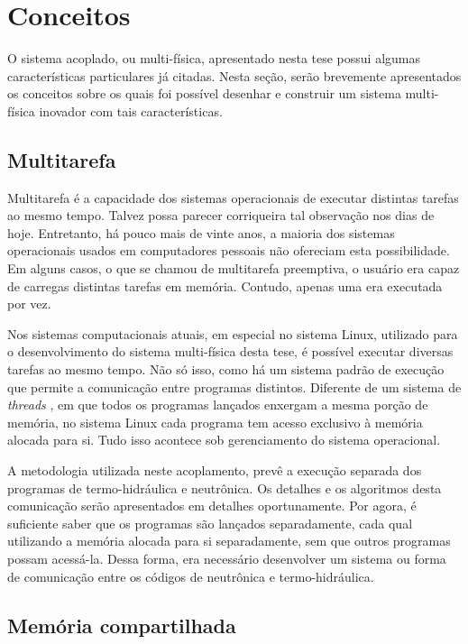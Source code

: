 \section{Conceitos}
\label{sec:conc}

O sistema acoplado, ou multi-física, apresentado nesta tese possui algumas características
particulares já citadas. Nesta seção, serão brevemente apresentados os conceitos sobre os quais
foi possível desenhar e construir um sistema multi-física inovador com tais características.

\subsection{Multitarefa}
\label{subsec:mt}

Multitarefa é a capacidade dos sistemas operacionais de executar distintas tarefas ao mesmo tempo.
Talvez possa parecer corriqueira tal observação nos dias de hoje. Entretanto, há pouco mais de vinte
anos, a maioria dos sistemas operacionais usados em computadores pessoais não ofereciam esta
possibilidade. Em alguns casos, o que se chamou de multitarefa preemptiva, o usuário era capaz de
carregas distintas tarefas em memória. Contudo, apenas uma era executada por vez.

Nos sistemas computacionais atuais, em especial no sistema Linux, utilizado para o desenvolvimento
do sistema multi-física desta tese, é possível executar diversas tarefas ao mesmo tempo. Não só isso,
como há um sistema padrão de execução que permite a comunicação entre programas distintos. Diferente
de um sistema de \textit{threads} \cite{Walli1995},
em que todos os programas lançados enxergam a mesma
porção de memória, no sistema Linux cada programa tem acesso exclusivo à memória alocada para si.
Tudo isso acontece sob gerenciamento do sistema operacional.

A metodologia utilizada neste acoplamento, prevê a execução separada dos programas de termo-hidráulica
e neutrônica. Os detalhes e os algoritmos desta comunicação serão apresentados em detalhes oportunamente.
Por agora, é suficiente saber que os programas são lançados separadamente, cada qual utilizando a memória
alocada para si separadamente, sem que outros programas possam acessá-la. Dessa forma, era necessário
desenvolver um sistema ou forma de comunicação entre os códigos de neutrônica e termo-hidráulica.

\subsection{Memória compartilhada}
\label{subsec:mc}

